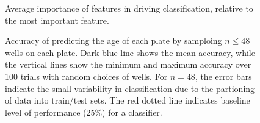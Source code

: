\documentclass{article}
\begin{document}
\begin{figure}
  \centering
  \caption{Average importance of features in driving classification,
    relative to the most important feature.}
\end{figure}

\begin{figure}
  \centering
  \caption{Accuracy of predicting the age of each plate by samploing
    $n \leq 48$ wells on each plate. Dark blue line shows the mean
    accuracy, while the vertical lines show the minimum and maximum
    accuracy over 100 trials with random choices of wells.  For
    $n=48$, the error bars indicate the small variability in
    classification due to the partioning of data into train/test sets.
    The red dotted line indicates baseline level of performance (25\%)
    for a classifier.}
\end{figure}
\end{document}
